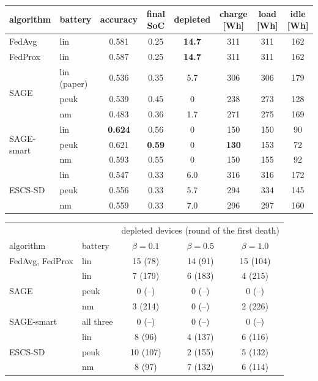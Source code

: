 \documentclass[11pt,a4paper]{article}
\begin{document}
\begin{center}
\small
\begin{tabular}{llcccccc}
\toprule
algorithm & battery & accuracy & final SoC & depleted & charge [Wh] & load [Wh] & idle [Wh] \\
\midrule
FedAvg  & lin & 0.581 & 0.25 & \textbf{14.7} & 311 & 311 & 162 \\
FedProx & lin & 0.587 & 0.25 & \textbf{14.7} & 311 & 311 & 162 \\
\midrule
\multirow{3}{*}{SAGE}       & lin (paper) & 0.536 & 0.35 & 5.7 & 306 & 306 & 179 \\
                            & peuk        & 0.539 & 0.45 & 0   & 238 & 273 & 128 \\
                            & nm          & 0.483 & 0.36 & 1.7 & 271 & 275 & 169 \\
\midrule
\multirow{3}{*}{SAGE-smart} & lin  & \textbf{0.624} & 0.56 & 0 & 150 & 150 & 90 \\
                            & peuk & 0.621 & \textbf{0.59} & 0 & \textbf{130} & 153 & 72 \\
                            & nm   & 0.593 & 0.55 & 0 & 150 & 155 & 92 \\
\midrule
\multirow{3}{*}{ESCS-SD}    & lin  & 0.547 & 0.33 & 6.0 & 316 & 316 & 172 \\
                            & peuk & 0.556 & 0.33 & 5.7 & 294 & 334 & 145 \\
                            & nm   & 0.559 & 0.33 & 7.0 & 296 & 297 & 160 \\
\bottomrule
\end{tabular}
\end{center}

\begin{center}
\begin{tabular}{llccc}
\toprule
 & & \multicolumn{3}{c}{depleted devices (round of the first death)} \\
algorithm & battery & $\beta=0.1$ & $\beta=0.5$ & $\beta=1.0$ \\
\midrule
FedAvg, FedProx          & lin   & 15 (78)  & 14 (91)  & 15 (104) \\
\midrule
\multirow{3}{*}{SAGE}    & lin   & 7 (179)  & 6 (183)  & 4 (215)  \\
                         & peuk  & 0 (--)   & 0 (--)   & 0 (--)   \\
                         & nm    & 3 (214)  & 0 (--)   & 2 (226)  \\
\midrule
SAGE-smart               & all three & 0 (--) & 0 (--) & 0 (--) \\
\midrule
\multirow{3}{*}{ESCS-SD} & lin   & 8 (96)   & 4 (137)  & 6 (116)  \\
                         & peuk  & 10 (107) & 2 (155)  & 5 (132)  \\
                         & nm    & 8 (97)   & 7 (132)  & 6 (114)  \\
\bottomrule
\end{tabular}
\end{center}
\end{document}
